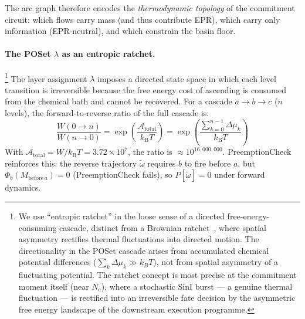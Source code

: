 \documentclass[11pt,a4paper]{article}
\newcommand{\kB}{k_{\mathrm{B}}}
\newcommand{\Nc}{N_{\mathrm{c}}}
\begin{document}
The arc graph therefore encodes the \emph{thermodynamic topology} of the
commitment circuit: which flows carry mass (and thus contribute EPR),
which carry only information (EPR-neutral), and which constrain the
basin floor.

\paragraph{The POSet $\lambda$ as an entropic ratchet.}\footnote{We use
``entropic ratchet'' in the loose sense of a directed free-energy-consuming
cascade, distinct from a Brownian ratchet~\cite{Ajdari1992,Magnasco1993},
where spatial asymmetry rectifies thermal fluctuations into directed motion.
The directionality in the POSet cascade arises from accumulated chemical
potential differences ($\sum_k \Delta\mu_k \gg k_BT$), not from spatial
asymmetry of a fluctuating potential.
The ratchet concept is most precise at the commitment moment itself
(near $\Nc$), where a stochastic SinI burst --- a genuine thermal
fluctuation --- is rectified into an irreversible fate decision by
the asymmetric free energy landscape of the downstream execution
programme.}
The layer assignment $\lambda$ imposes a directed state space in which
each level transition is irreversible because the free energy cost of
ascending is consumed from the chemical bath and cannot be recovered.
For a cascade $a \to b \to c$ ($n$ levels), the forward-to-reverse ratio
of the full cascade is:
\begin{equation}
  \frac{W(0 \to n)}{W(n \to 0)}
  = \exp\!\left(\frac{\mathcal{A}_{\mathrm{total}}}{\kB T}\right)
  = \exp\!\left(\frac{\sum_{k=0}^{n-1} \Delta\mu_k}{\kB T}\right)
  \label{eq:ratchet}
\end{equation}
With $\mathcal{A}_{\mathrm{total}} = W/\kB T = 3.72\times10^7$, the
ratio is $\approx 10^{16{,}000{,}000}$.
PreemptionCheck reinforces this: the reverse trajectory $\tilde\omega$
requires $b$ to fire before $a$, but $\Phi_b(M_{\mathrm{before}\,a}) = 0$
(PreemptionCheck fails), so $P[\tilde\omega] = 0$ under forward dynamics.
\end{document}
